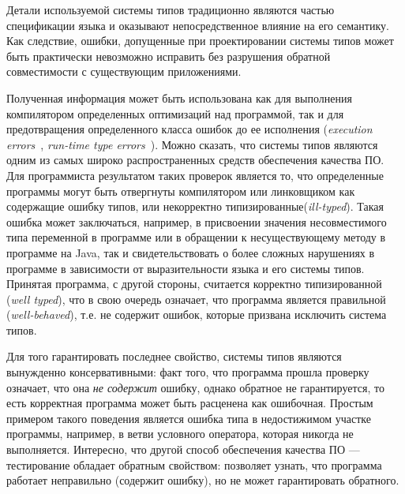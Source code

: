 
Детали используемой системы типов традиционно являются частью спецификации языка
и оказывают непосредственное влияние на его семантику. Как следствие, ошибки,
допущенные при проектировании системы типов может быть практически невозможно
исправить без разрушения обратной совместимости с существующим приложениями.


Полученная информация может быть использована как для выполнения компилятором
определенных оптимизаций над программой, так и для предотвращения определенного
класса ошибок до ее исполнения (\emph{execution errors}~\cite{Cardelli2004},
\emph{run-time type errors}~\cite{Pierce2002}). Можно сказать, что системы типов
являются одним из самых широко распространенных средств обеспечения качества ПО.
Для программиста результатом таких проверок является то, что определенные
программы могут быть отвергнуты компилятором или линковщиком как содержащие
ошибку типов, или некорректно типизированные(\emph{ill-typed}).
Такая ошибка может заключаться, например, в присвоении значения несовместимого
типа переменной в программе или в обращении к несуществующему методу в программе
на Java, так и свидетельствовать о более сложных нарушениях в программе в
зависимости от выразительности языка и его системы типов. Принятая 
программа, с другой стороны, считается корректно типизированной (\emph{well
  typed}), что в свою очередь означает, что программа является правильной
(\emph{well-behaved}), т.е. не содержит ошибок, которые призвана исключить
система типов. 

Для того гарантировать последнее свойство, системы типов являются 
вынужденно консервативными: факт того, что программа прошла проверку означает, что
она \emph{не содержит} ошибку, однако обратное не гарантируется, то есть
корректная программа может быть расценена как ошибочная. Простым примером
такого поведения является ошибка типа в недостижимом участке программы,
например, в ветви условного оператора, которая никогда не выполняется. 
Интересно, что другой способ обеспечения качества ПО --- тестирование обладает
обратным свойством: позволяет узнать, что программа работает неправильно
(содержит ошибку), но не может гарантировать обратного.

